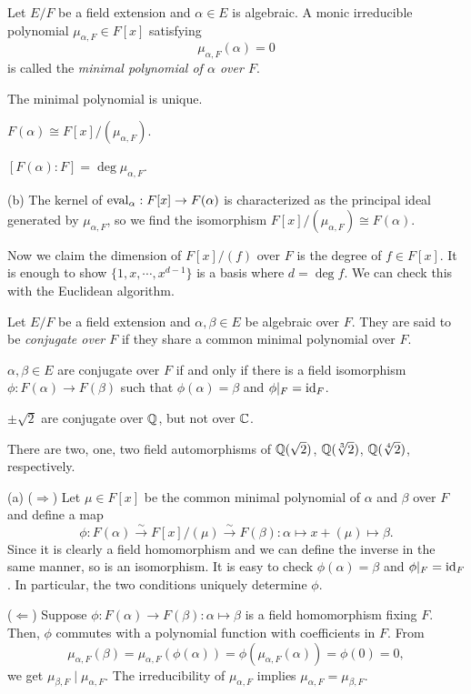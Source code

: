 \documentclass{../../large}
\begin{document}
\begin{prb}
Let $E/F$ be a field extension and $\alpha\in E$ is algebraic.
A monic irreducible polynomial $\mu_{\alpha,F}\in F[x]$ satisfying 
\[\mu_{\alpha,F}(\alpha)=0\]
is called the \emph{minimal polynomial of $\alpha$ over $F$}.
\begin{parts}
\item The minimal polynomial is unique.
\item $F(\alpha)\cong F[x]/(\mu_{\alpha,F})$.
\item $[F(\alpha):F]=\deg\mu_{\alpha,F}$.
\end{parts}
\end{prb}
\begin{pf}
(b)
The kernel of $\operatorname{eval}_\alpha:F[x]\to F(\alpha)$ is characterized as the principal ideal generated by $\mu_{\alpha,F}$, so we find the isomorphism $F[x]/(\mu_{\alpha,F})\cong F(\alpha)$.

Now we claim the dimension of $F[x]/(f)$ over $F$ is the degree of $f\in F[x]$.
It is enough to show $\{1,x,\cdots,x^{d-1}\}$ is a basis where $d=\deg f$.
We can check this with the Euclidean algorithm.
\end{pf}



\begin{prb}
Let $E/F$ be a field extension and $\alpha,\beta\in E$ be algebraic over $F$.
They are said to be \emph{conjugate over $F$} if they share a common minimal polynomial over $F$.
\begin{parts}
\item $\alpha,\beta\in E$ are conjugate over $F$ if and only if there is a field isomorphism $\phi:F(\alpha)\to F(\beta)$ such that $\phi(\alpha)=\beta$ and $\phi|_F=\operatorname{id}_F$.
\item $\pm\sqrt2$ are conjugate over $\mathbb{Q}$, but not over $\mathbb{C}$.
\item There are two, one, two field automorphisms of $\mathbb{Q}(\sqrt2)$, $\mathbb{Q}(\sqrt[3]2)$, $\mathbb{Q}(\sqrt[4]2)$, respectively.
\end{parts}
\end{prb}
\begin{pf}
(a)
($\Rightarrow$)
Let $\mu\in F[x]$ be the common minimal polynomial of $\alpha$ and $\beta$ over $F$ and define a map
\[\phi:F(\alpha)\stackrel\sim\to F[x]/(\mu)\stackrel\sim\to F(\beta):\alpha\mapsto x+(\mu)\mapsto\beta.\]
Since it is clearly a field homomorphism and we can define the inverse in the same manner, so is an isomorphism.
It is easy to check $\phi(\alpha)=\beta$ and $\phi|_F=\operatorname{id}_F$.
In particular, the two conditions uniquely determine $\phi$.

($\Leftarrow$)
Suppose $\phi:F(\alpha)\to F(\beta):\alpha\mapsto\beta$ is a field homomorphism fixing $F$.
Then, $\phi$ commutes with a polynomial function with coefficients in $F$.
From
\[\mu_{\alpha,F}(\beta)=\mu_{\alpha,F}(\phi(\alpha))=\phi(\mu_{\alpha,F}(\alpha))=\phi(0)=0,\]
we get $\mu_{\beta,F}\mid\mu_{\alpha,F}$.
The irreducibility of $\mu_{\alpha,F}$ implies $\mu_{\alpha,F}=\mu_{\beta,F}$.
\end{pf}
\end{document}
